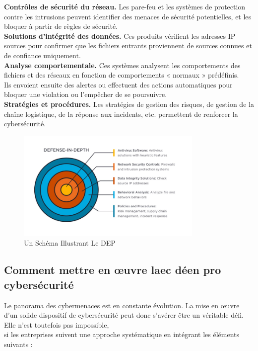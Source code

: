 \textbf{Contrôles de sécurité du réseau.} 
Les pare-feu et les systèmes de protection contre les intrusions peuvent identifier des menaces de sécurité potentielles, et les bloquer à partir de règles de sécurité.\\

\textbf{Solutions d’intégrité des données.}
Ces produits vérifient les adresses IP sources pour confirmer que les fichiers entrants proviennent de sources connues et de confiance uniquement.\\

	\textbf{Analyse comportementale.} Ces systèmes analysent les comportements des fichiers et des réseaux en fonction de comportements « normaux » prédéfinis.\\
		Ils envoient ensuite des alertes ou effectuent des actions automatiques pour bloquer une violation ou l’empêcher de se poursuivre.\\
		
	\textbf{Stratégies et procédures.} Les stratégies de gestion des risques, de gestion de la chaîne logistique, de la réponse aux incidents, etc. permettent de renforcer la cybersécurité.\\
\begin{figure}[h]
\begin{center}
\includegraphics[width=0.8\textwidth]{PhotoMemoire/dep_image.png}
\caption{Un Schéma Illustrant Le DEP \cite{15} }
\end{center}
	\end{figure}
	
	
	
	\pagebreak
	\newpage
	\subsection{Comment mettre en œuvre laec déen pro cybersécurité}
 Le panorama des cybermenaces est en constante évolution. La mise en œuvre d’un solide dispositif de cybersécurité peut donc s’avérer être un véritable défi. Elle n’est toutefois pas impossible,\\
  si les entreprises suivent une approche systématique en intégrant les éléments suivants :
  
